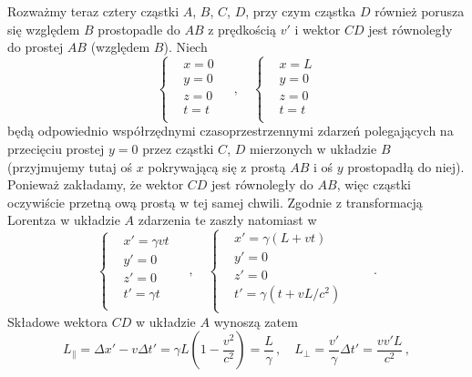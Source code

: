 \documentclass[../main.tex]{subfiles}
\begin{document}
Rozważmy teraz cztery cząstki \(A\), $B$, $C$, $D$, przy czym cząstka $D$ również porusza się względem $B$ prostopadle do $AB$ z prędkością \(v'\) i wektor \(CD\) jest równoległy do prostej \(AB\) (względem \(B\)). Niech
\begin{equation*}
    \begin{cases}
    &x=0\\
    &y=0\\
    &z=0\\
    &t=t\\
    \end{cases}\quad\,,\quad
    \begin{cases}
     &x=L\\
     &y=0\\
     &z=0\\
     &t=t\\
    \end{cases}
\end{equation*}
będą odpowiednio współrzędnymi czasoprzestrzennymi zdarzeń polegających na przecięciu prostej \(y=0\) przez cząstki \(C\), \(D\) mierzonych w układzie \(B\) (przyjmujemy tutaj oś \(x\) pokrywającą się z prostą \(AB\) i oś \(y\) prostopadłą do niej). Ponieważ zakładamy, że wektor \(CD\) jest równoległy do \(AB\), więc cząstki oczywiście przetną ową prostą w tej samej chwili. Zgodnie z transformacją Lorentza w układzie \(A\) zdarzenia te zaszły natomiast w 
    \begin{equation*}
    \begin{cases}
    &x'=\gamma vt\\
    &y'=0\\
    &z'=0\\
    &t'=\gamma t\\
    \end{cases}\quad\,,\quad
    \begin{cases}
     &x'=\gamma(L+vt)\\
     &y'=0\\
     &z'=0\\
     &t'=\gamma(t+vL/c^2)\\
    \end{cases}\quad\quad\,.
\end{equation*}
Składowe wektora \(CD\) w układzie \(A\) wynoszą zatem
\begin{equation*}
    L_\parallel=\Delta x'-v\Delta t'=\gamma L\left(1-\frac{v^2}{c^2}\right)=\frac{L}{\gamma}\,,\quad L_\perp=\frac{v'}{\gamma}\Delta t'=\frac{vv'L}{c^2}\,,
\end{equation*}
\end{document}
